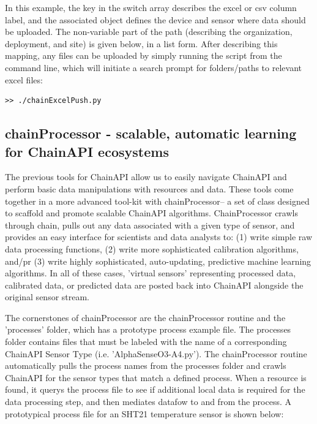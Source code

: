 In this example, the key in the switch array describes the excel or csv column label, and the associated object defines the device and sensor where data should be uploaded.  The non-variable part of the path (describing the organization, deployment, and site) is given below, in a list form.  After describing this mapping, any files can be uploaded by simply running the script from the command line, which will initiate a search prompt for folders/paths to relevant excel files:

\begin{lstlisting}[style=code]
>> ./chainExcelPush.py
\end{lstlisting}

\subsection{chainProcessor - scalable, automatic learning for ChainAPI ecosystems}

The previous tools for ChainAPI allow us to easily navigate ChainAPI and perform basic data manipulations with resources and data.  These tools come together in a more advanced tool-kit with chainProcessor-- a set of class designed to scaffold and promote scalable ChainAPI algorithms.  ChainProcessor crawls through chain, pulls out any data associated with a given type of sensor, and provides an easy interface for scientists and data analysts to: (1) write simple raw data processing functions, (2) write more sophisticated calibration algorithms, and/pr (3) write highly sophisticated, auto-updating, predictive machine learning algorithms.  In all of these cases, 'virtual sensors' representing processed data, calibrated data, or predicted data are posted back into ChainAPI alongside the original sensor stream.

The cornerstones of chainProcessor are the chainProcessor routine and the 'processes' folder, which has a prototype process example file.  The processes folder contains files that must be labeled with the name of a corresponding ChainAPI Sensor Type (i.e. 'AlphaSenseO3-A4.py').  The chainProcessor routine automatically pulls the process names from the processes folder and crawls ChainAPI for the sensor types that match a defined process.  When a resource is found, it querys the process file to see if additional local data is required for the data processing step, and then mediates datafow to and from the process.  A prototypical process file for an SHT21 temperature sensor is shown below:


